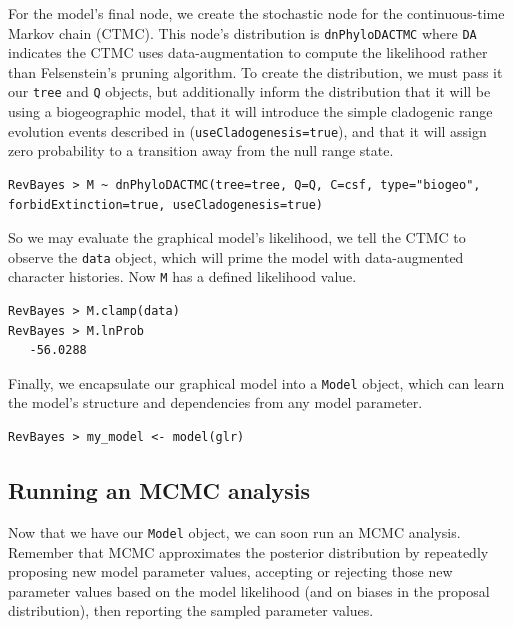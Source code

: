 \documentclass[11pt]{article}
\begin{document}
For the model's final node, we create the stochastic node for the continuous-time Markov chain (CTMC).
This node's distribution is {\tt dnPhyloDACTMC} where {\tt DA} indicates the CTMC uses data-augmentation to compute the likelihood rather than Felsenstein's pruning algorithm.
To create the distribution, we must pass it our {\tt tree} and {\tt Q} objects, but additionally inform the distribution that it will be using a biogeographic model, that it will introduce the simple cladogenic range evolution events described in \citet{ree08} ({\tt useCladogenesis=true}), and that it will assign zero probability to a transition away from the null range state.

\begin{snugshade}
\begin{lstlisting}
RevBayes > M ~ dnPhyloDACTMC(tree=tree, Q=Q, C=csf, type="biogeo", forbidExtinction=true, useCladogenesis=true)
\end{lstlisting}
\end{snugshade}

So we may evaluate the graphical model's likelihood, we tell the CTMC to observe the {\tt data} object, which will prime the model with data-augmented character histories.
Now {\tt M} has a defined likelihood value.
\begin{snugshade}
\begin{lstlisting}
RevBayes > M.clamp(data)
RevBayes > M.lnProb
   -56.0288
\end{lstlisting}
\end{snugshade}

Finally, we encapsulate our graphical model into a {\tt Model} object, which can learn the model's structure and dependencies from any model parameter.
\begin{snugshade}
\begin{lstlisting}
RevBayes > my_model <- model(glr)
\end{lstlisting}
\end{snugshade}

\subsection{Running an MCMC analysis}

Now that we have our {\tt Model} object, we can soon run an MCMC analysis.
Remember that MCMC approximates the posterior distribution by repeatedly proposing new model parameter values, accepting or rejecting those new parameter values based on the model likelihood (and on biases in the proposal distribution), then reporting the sampled parameter values.
\end{document}
